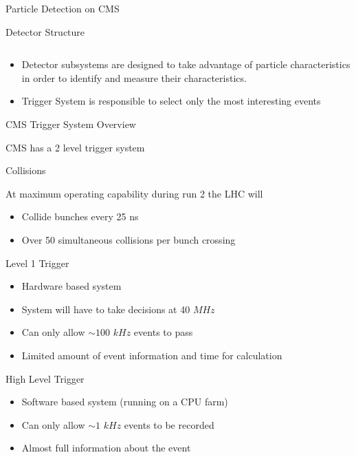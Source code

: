 \documentclass[8pt]{beamer}
\begin{document}
\begin{frame}{Particle Detection on CMS}
\begin{block}{Detector Structure}
\begin{columns}
    \end{columns}

  \end{block}

  \begin{itemize}
    \item Detector subsystems are designed to take advantage of particle characteristics in order to identify and measure
          their characteristics.
    \item Trigger System is responsible to select only the most interesting events
  \end{itemize} 

\end{frame}

\begin{frame}{CMS Trigger System Overview}

CMS has a 2 level trigger system

\begin{block}{Collisions}

At maximum operating capability during run 2 the LHC will

  \begin{itemize}
    \item Collide bunches every 25 ns
    \item Over 50 simultaneous collisions per bunch crossing
  \end{itemize}

\end{block}

\begin{block}{Level 1 Trigger}

  \begin{itemize}
    \item Hardware based system
    \item System will have to take decisions at 40 $MHz$
    \item Can only allow $\sim100$ $kHz$ events to pass
    \item Limited amount of event information and time for calculation 
  \end{itemize}

\end{block}

\begin{block}{High Level Trigger}

  \begin{itemize}
    \item Software based system (running on a CPU farm)
    \item Can only allow $\sim1$ $kHz$ events to be recorded
    \item Almost full information about the event 
  \end{itemize}

\end{block}

\end{frame}
\end{document}
